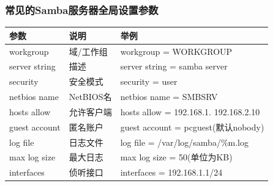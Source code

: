 \documentclass[xcolor=svgnames,presentation]{beamer}
\begin{document}
\begin{frame}
\frametitle{常见的Samba服务器全局设置参数}
\label{sec-2-10}


\begin{center}
\begin{tabular}{lll}
 参数           &  说明        &  举例                                   \\
\hline
 workgroup      &  域/工作组   &  workgroup = WORKGROUP                  \\
 server string  &  描述        &  server string = samba server           \\
 security       &  安全模式    &  security = user                        \\
 netbios name   &  NetBIOS名   &  netbios name = SMBSRV                  \\
 hosts allow    &  允许客户端  &  hosts allow = 192.168.1. 192.168.2.10  \\
 guest account  &  匿名账户    &  guest account = pcguest(默认nobody)    \\
 log file       &  日志文件    &  log file = /var/log/samba/\%m.log      \\
 max log size   &  最大日志    &  max log size = 50(单位为KB)            \\
 interfaces     &  侦听接口    &  interfaces = 192.168.1.1/24            \\
\end{tabular}
\end{center}
\end{frame}
\end{document}
